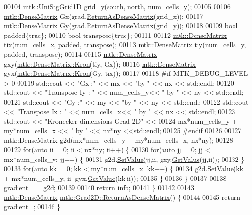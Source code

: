\begin{DoxyCode}
00104   \hyperlink{classmtk_1_1UniStgGrid1D}{mtk::UniStgGrid1D} grid\_y(south, north, num\_cells\_y);
00105 
00106   \hyperlink{classmtk_1_1DenseMatrix}{mtk::DenseMatrix} Gx(grad.\hyperlink{classmtk_1_1Grad1D_a4218516bfb43f683559322ea97058c78}{ReturnAsDenseMatrix}(grid\_x));
00107   \hyperlink{classmtk_1_1DenseMatrix}{mtk::DenseMatrix} Gy(grad.\hyperlink{classmtk_1_1Grad1D_a4218516bfb43f683559322ea97058c78}{ReturnAsDenseMatrix}(grid\_y));
00108 
00109   \textcolor{keywordtype}{bool} padded\{\textcolor{keyword}{true}\};
00110   \textcolor{keywordtype}{bool} transpose\{\textcolor{keyword}{true}\};
00111 
00112   \hyperlink{classmtk_1_1DenseMatrix}{mtk::DenseMatrix} tix(num\_cells\_x, padded, transpose);
00113   \hyperlink{classmtk_1_1DenseMatrix}{mtk::DenseMatrix} tiy(num\_cells\_y, padded, transpose);
00114 
00115   \hyperlink{classmtk_1_1DenseMatrix}{mtk::DenseMatrix} gxy(\hyperlink{classmtk_1_1DenseMatrix_a01d3d8bd502870f93bf3a88a0cc5fb49}{mtk::DenseMatrix::Kron}(tiy, Gx));
00116   \hyperlink{classmtk_1_1DenseMatrix}{mtk::DenseMatrix} gyx(\hyperlink{classmtk_1_1DenseMatrix_a01d3d8bd502870f93bf3a88a0cc5fb49}{mtk::DenseMatrix::Kron}(Gy, tix));
00117 
00118 \textcolor{preprocessor}{  #if MTK\_DEBUG\_LEVEL > 0}
00119   std::cout << \textcolor{stringliteral}{"Gx :"} << mx << \textcolor{stringliteral}{"by "} << nx << std::endl;
00120   std::cout << \textcolor{stringliteral}{"Transpose Iy : "} << num\_cells\_y<< \textcolor{stringliteral}{" by "} << ny  << std::endl;
00121   std::cout << \textcolor{stringliteral}{"Gy :"} << my << \textcolor{stringliteral}{"by "} << ny << std::endl;
00122   std::cout << \textcolor{stringliteral}{"Transpose Ix : "} << num\_cells\_x<< \textcolor{stringliteral}{" by "} << nx  << std::endl;
00123   std::cout << \textcolor{stringliteral}{"Kronecker dimensions Grad 2D"} <<
00124     mx*num\_cells\_y + my*num\_cells\_x << \textcolor{stringliteral}{" by "} <<  nx*ny <<std::endl;
00125 \textcolor{preprocessor}{  #endif}
00126 
00127   \hyperlink{classmtk_1_1DenseMatrix}{mtk::DenseMatrix} g2d(mx*num\_cells\_y + my*num\_cells\_x, nx*ny);
00128 
00129   \textcolor{keywordflow}{for}(\textcolor{keyword}{auto} ii = 0; ii < nx*ny; ii++) \{
00130     \textcolor{keywordflow}{for}(\textcolor{keyword}{auto} jj = 0; jj < mx*num\_cells\_y; jj++) \{
00131       g2d.\hyperlink{classmtk_1_1DenseMatrix_ae0f873a6d3a734da467cafb817da64ae}{SetValue}(jj,ii, gxy.\hyperlink{classmtk_1_1DenseMatrix_a87fb785713c04b13767947cc3325ce7c}{GetValue}(jj,ii));
00132     \}
00133     \textcolor{keywordflow}{for}(\textcolor{keyword}{auto} kk = 0; kk < my*num\_cells\_x; kk++) \{
00134       g2d.\hyperlink{classmtk_1_1DenseMatrix_ae0f873a6d3a734da467cafb817da64ae}{SetValue}(kk + mx*num\_cells\_y, ii, gyx.\hyperlink{classmtk_1_1DenseMatrix_a87fb785713c04b13767947cc3325ce7c}{GetValue}(kk,ii));
00135     \}
00136   \}
00137 
00138   gradient\_ = g2d;
00139 
00140   \textcolor{keywordflow}{return} info;
00141 \}
00142 
\hypertarget{mtk__grad__2d_8cc_source_l00143}{}\hyperlink{classmtk_1_1Grad2D_afa14fa1b84f05752027c1cef66381de8}{00143} \hyperlink{classmtk_1_1DenseMatrix}{mtk::DenseMatrix} \hyperlink{classmtk_1_1Grad2D_afa14fa1b84f05752027c1cef66381de8}{mtk::Grad2D::ReturnAsDenseMatrix}() \{
00144 
00145   \textcolor{keywordflow}{return} gradient\_;
00146 \}
\end{DoxyCode}
